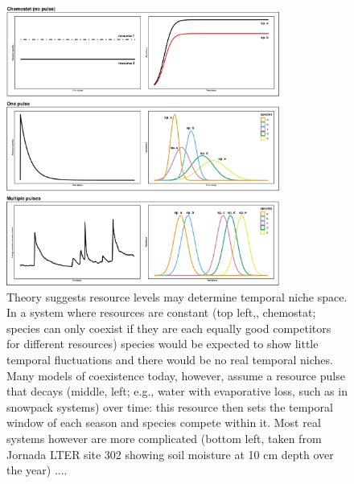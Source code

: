 \documentclass[11pt]{article}
\begin{document}

\begin{figure}[h!]
\centering
\includegraphics[width=0.8\textwidth]{..//figures/JN_conceptfigs/sixpanel_concept.png}
\caption{Theory suggests resource levels may determine temporal niche space. In a system where resources are constant (top left,, chemostat; species can only coexist if they are each equally good competitors for different resources) species would be expected to show little temporal fluctuations and there would be no real temporal niches. Many models of coexistence today, however, assume a resource pulse that decays (middle, left; e.g., water with evaporative loss, such as in snowpack systems) over time: this resource then sets the temporal window of each season and species compete within it. Most real systems however are more complicated (bottom left, taken from Jornada LTER site 302 showing soil moisture at 10 cm depth over the year) ....} 
 \label{fig:resource}
\end{figure}
\end{document}
